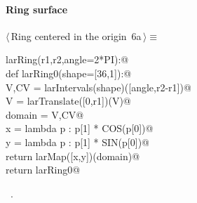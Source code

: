 \documentclass[11pt,oneside]{article}	%
\begin{document}
\paragraph{Ring surface}
\begin{flushleft} \small \label{scrap9}
\protect{}$\langle\,$Ring centered in the origin\nobreak\ {\footnotesize 6a}$\,\rangle\equiv$
\vspace{-1ex}
\begin{list}{}{} \item
\mbox{}\verb@def larRing(r1,r2,angle=2*PI):@\\
\mbox{}\verb@   def larRing0(shape=[36,1]):@\\
\mbox{}\verb@      V,CV = larIntervals(shape)([angle,r2-r1])@\\
\mbox{}\verb@      V = larTranslate([0,r1])(V)@\\
\mbox{}\verb@      domain = V,CV@\\
\mbox{}\verb@      x = lambda p : p[1] * COS(p[0])@\\
\mbox{}\verb@      y = lambda p : p[1] * SIN(p[0])@\\
\mbox{}\verb@      return larMap([x,y])(domain)@\\
\mbox{}\verb@   return larRing0@\\
\mbox{}\verb@@{\NWsep}
\end{list}
\vspace{-1ex}
\footnotesize\addtolength{\baselineskip}{-1ex}
\begin{list}{}{\setlength{\itemsep}{-\parsep}\setlength{\itemindent}{-\leftmargin}}
\item \NWtxtMacroRefIn\ .
\end{list}
\end{flushleft}
\end{document}
